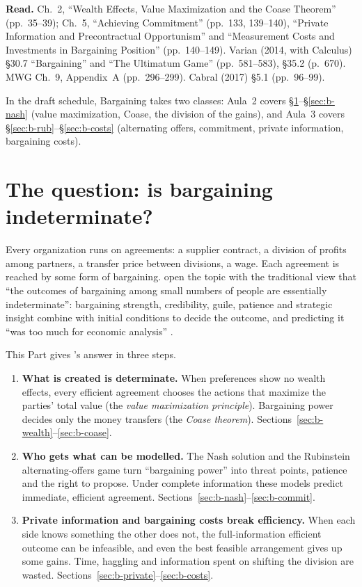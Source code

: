 
\textbf{Read.} \MR{} Ch.~2, ``Wealth Effects, Value Maximization and the Coase Theorem''
(pp.~35--39); Ch.~5, ``Achieving Commitment'' (pp.~133, 139--140), ``Private Information and
Precontractual Opportunism'' and ``Measurement Costs and Investments in Bargaining Position''
(pp.~140--149). Varian (2014, with Calculus) \S30.7 ``Bargaining'' and ``The Ultimatum Game''
(pp.~581--583), \S35.2 (p.~670). MWG Ch.~9, Appendix~A (pp.~296--299). Cabral (2017) \S5.1
(pp.~96--99).

In the draft schedule, Bargaining takes two classes: Aula~2 covers
\S\ref{sec:b-question}--\S\ref{sec:b-nash} (value maximization, Coase, the division of the
gains), and Aula~3 covers \S\ref{sec:b-rub}--\S\ref{sec:b-costs} (alternating offers,
commitment, private information, bargaining costs).

\section{The question: is bargaining indeterminate?}\label{sec:b-question}

Every organization runs on agreements: a supplier contract, a division of profits among
partners, a transfer price between divisions, a wage. Each agreement is reached by some form of
bargaining. \MR{} open the topic with the traditional view that ``the outcomes of bargaining among
small numbers of people are essentially indeterminate'': bargaining strength, credibility,
guile, patience and strategic insight combine with initial conditions to decide the outcome,
and predicting it ``was too much for economic analysis'' .

This Part gives \MR's answer in three steps.

\begin{enumerate}
  \item \textbf{What is created is determinate.} When preferences show no wealth effects, every
  efficient agreement chooses the actions that maximize the parties' total value (the
  \emph{value maximization principle}). Bargaining power decides only the money transfers (the
  \emph{Coase theorem}). Sections~\ref{sec:b-wealth}--\ref{sec:b-coase}.
  \item \textbf{Who gets what can be modelled.} The Nash solution and the Rubinstein
  alternating-offers game turn ``bargaining power'' into threat points, patience and the right
  to propose. Under complete information these models predict immediate, efficient agreement.
  Sections~\ref{sec:b-nash}--\ref{sec:b-commit}.
  \item \textbf{Private information and bargaining costs break efficiency.} When each side knows
  something the other does not, the full-information efficient outcome can be infeasible, and
  even the best feasible arrangement gives up some gains. Time, haggling and information spent
  on shifting the division are wasted. Sections~\ref{sec:b-private}--\ref{sec:b-costs}.
\end{enumerate}

